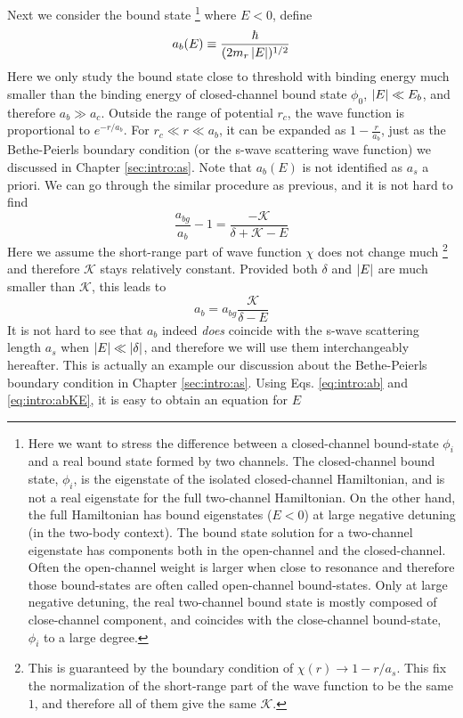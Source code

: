 Next we consider the bound state \footnote{Here we want to stress the difference between a closed-channel bound-state $\phi_{i}$ and a real bound state  formed by two channels.   The closed-channel bound state, $\phi_{i}$, is the eigenstate of the  isolated closed-channel Hamiltonian, and is not a real eigenstate for the full two-channel Hamiltonian.  On the other hand, the full  Hamiltonian has bound eigenstates ($E<0$) at large negative detuning (in the two-body context).  The bound state solution for a two-channel eigenstate has components both in the open-channel and the closed-channel.  Often the open-channel weight is larger when close to resonance and therefore those bound-states are often called open-channel bound-states.  Only at large negative detuning, the real two-channel bound state is mostly composed of close-channel component, and coincides with the close-channel bound-state, $\phi_{i}$ to a large degree.}
where $E<0$, define
\begin{equation}\label{eq:intro:ab}
a_{b}(E)\equiv\frac{\hbar}{(2m_{r}\left\lvert{E}\right\rvert)^{1/2}}
\end{equation}
 Here we only study the bound state close to threshold with binding energy much smaller than the binding energy of closed-channel bound state $\phi_{0}$, $\left\lvert{E}\right\rvert\ll{}E_{b}$, and therefore $a_{b}\gg{a_{c}}$.  Outside the range of potential $r_{c}$,  the wave function is proportional to $e^{-r/a_{b}}$. For $r_{c}\ll{}r\ll{}a_{b}$, it can be expanded as  $1-\frac{r}{a_{b}}$, just as the Bethe-Peierls boundary condition (or the s-wave scattering wave function) we discussed in Chapter \ref{sec:intro:as}.  Note that $a_{b}(E)$ is not identified as $a_{s}$ a priori.  We can go through the similar procedure as previous, and it is not hard to find
\begin{equation}
\frac{a_{bg}}{a_{b}}-1=\frac{-\mathcal{K}}{\delta+\mathcal{K}-E}
\end{equation}
Here we assume the short-range part of wave function $\chi$ does not change much \footnote{This is guaranteed by the boundary condition of $\chi(r)\to1-r/a_{s}$.  This fix the normalization of the short-range part of the wave function to be the same $1$, and therefore all of them give the same $\mathcal{K}$.} and therefore $\mathcal{K}$ stays relatively constant.  Provided both $\delta$ and $\left\lvert{E}\right\rvert$ are much smaller than $\mathcal{K}$, this leads to 
\begin{equation}\label{eq:intro:abKE}
a_{b}=a_{bg}\frac{\mathcal{K}}{\delta-E}
\end{equation}
It is not hard to see that $a_{b}$ indeed \emph{does} coincide with the s-wave scattering length $a_{s}$ when $\left\lvert{E}\right\rvert\ll\left\lvert{\delta}\right\rvert$, and therefore we will use them interchangeably hereafter. This is actually an example our discussion about the Bethe-Peierls boundary condition in Chapter \ref{sec:intro:as}.  Using Eqs. \ref{eq:intro:ab} and \ref{eq:intro:abKE}, it is easy to obtain an equation for $E$
